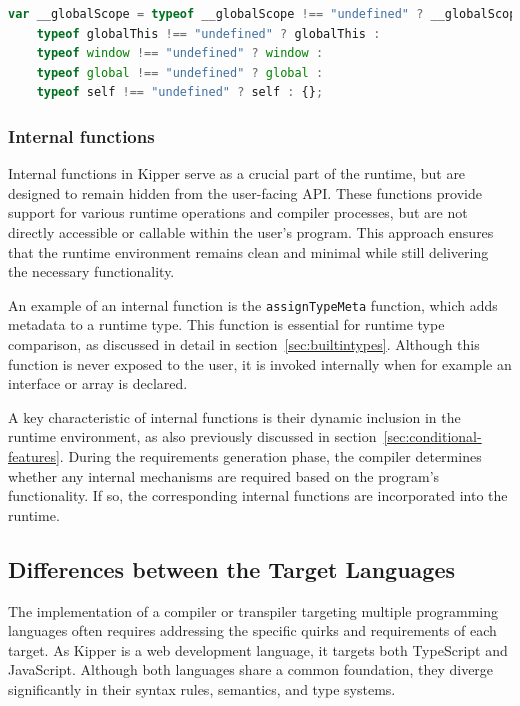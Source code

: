 \begin{lstlisting}[language=TypeScript,caption=Global Scope Logic,label=lst:implementation:globalscopelogic]
var __globalScope = typeof __globalScope !== "undefined" ? __globalScope :
    typeof globalThis !== "undefined" ? globalThis :
    typeof window !== "undefined" ? window :
    typeof global !== "undefined" ? global :
    typeof self !== "undefined" ? self : {};
\end{lstlisting}

\subsubsection{Internal functions}

Internal functions in Kipper serve as a crucial part of the runtime, but are designed to remain hidden from the user-facing API. These functions provide support for various runtime operations and compiler processes, but are not directly accessible or callable within the user's program. This approach ensures that the runtime environment remains clean and minimal while still delivering the necessary functionality.

An example of an internal function is the \lstinline|assignTypeMeta| function, which adds metadata to a runtime type. This function is essential for runtime type comparison, as discussed in detail in section~\ref{sec:builtintypes}. Although this function is never exposed to the user, it is invoked internally when for example an interface or array is declared.

A key characteristic of internal functions is their dynamic inclusion in the runtime environment, as also previously discussed in section~\ref{sec:conditional-features}. During the requirements generation phase, the compiler determines whether any internal mechanisms are required based on the program's functionality. If so, the corresponding internal functions are incorporated into the runtime.

\subsection{Differences between the Target Languages}

The implementation of a compiler or \gls{transpiler} targeting multiple programming languages often requires addressing the specific quirks and requirements of each target. As Kipper is a web development language, it targets both TypeScript and JavaScript. Although both languages share a common foundation, they diverge significantly in their syntax rules, semantics, and type systems.

